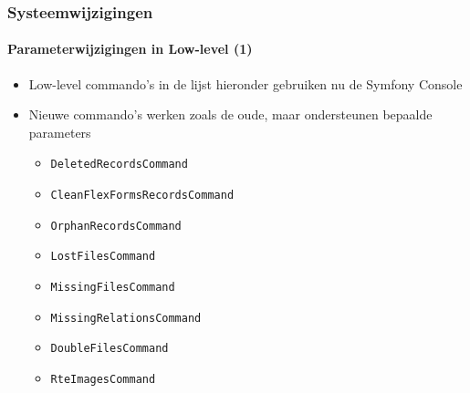 \begin{frame}[fragile]
	\frametitle{Systeemwijzigingen}
	\framesubtitle{Parameterwijzigingen in Low-level (1)}


	\begin{itemize}
		\item Low-level commando's in de lijst hieronder gebruiken nu de Symfony Console
		\item Nieuwe commando's werken zoals de oude, maar ondersteunen bepaalde parameters

			\begin{itemize}
				\item \texttt{DeletedRecordsCommand}
				\item \texttt{CleanFlexFormsRecordsCommand}
				\item \texttt{OrphanRecordsCommand}
				\item \texttt{LostFilesCommand}
				\item \texttt{MissingFilesCommand}
				\item \texttt{MissingRelationsCommand}
				\item \texttt{DoubleFilesCommand}
				\item \texttt{RteImagesCommand}
			\end{itemize}

	\end{itemize}

\end{frame}

